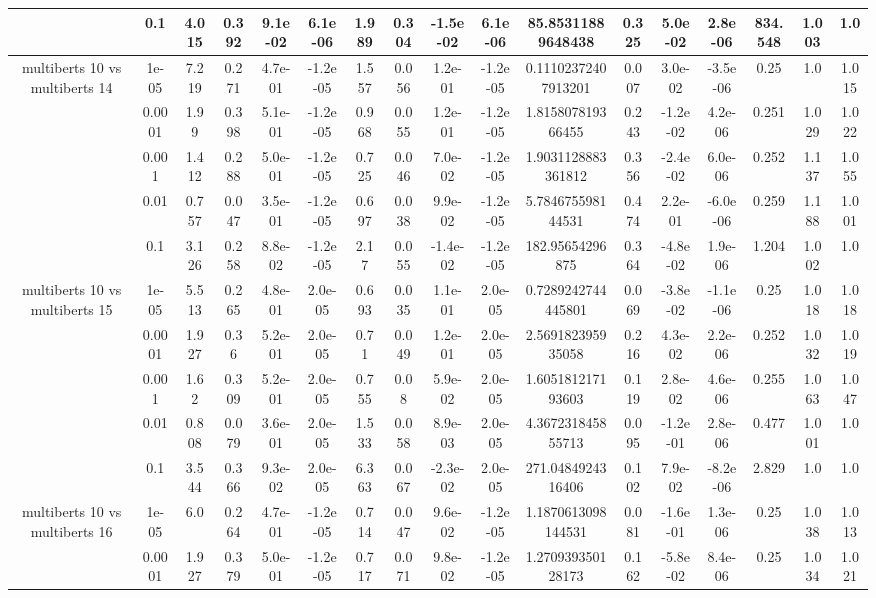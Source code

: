 \begin{tabular}{|c|c|c|c|c|c|c|c|c|c|c|c|c|c|c|c|c|}
 & 0.1 & 4.015 & 0.392 & 9.1e-02 & 6.1e-06 & 1.989 & 0.304 & -1.5e-02 & 6.1e-06 & 85.85311889648438 & 0.325 & 5.0e-02 & 2.8e-06 & 834.548 & 1.003 & 1.0 \\
\hline
\multirow{5}{*}{multiberts 10 vs multiberts 14} & 1e-05 & 7.219 & 0.271 & 4.7e-01 & -1.2e-05 & 1.557 & 0.056 & 1.2e-01 & -1.2e-05 & 0.11102372407913201 & 0.007 & 3.0e-02 & -3.5e-06 & 0.25 & 1.0 & 1.015 \\
 & 0.0001 & 1.99 & 0.398 & 5.1e-01 & -1.2e-05 & 0.968 & 0.055 & 1.2e-01 & -1.2e-05 & 1.815807819366455 & 0.243 & -1.2e-02 & 4.2e-06 & 0.251 & 1.029 & 1.022 \\
 & 0.001 & 1.412 & 0.288 & 5.0e-01 & -1.2e-05 & 0.725 & 0.046 & 7.0e-02 & -1.2e-05 & 1.9031128883361812 & 0.356 & -2.4e-02 & 6.0e-06 & 0.252 & 1.137 & 1.055 \\
 & 0.01 & 0.757 & 0.047 & 3.5e-01 & -1.2e-05 & 0.697 & 0.038 & 9.9e-02 & -1.2e-05 & 5.784675598144531 & 0.474 & 2.2e-01 & -6.0e-06 & 0.259 & 1.188 & 1.001 \\
 & 0.1 & 3.126 & 0.258 & 8.8e-02 & -1.2e-05 & 2.17 & 0.055 & -1.4e-02 & -1.2e-05 & 182.95654296875 & 0.364 & -4.8e-02 & 1.9e-06 & 1.204 & 1.002 & 1.0 \\
\hline
\multirow{5}{*}{multiberts 10 vs multiberts 15} & 1e-05 & 5.513 & 0.265 & 4.8e-01 & 2.0e-05 & 0.693 & 0.035 & 1.1e-01 & 2.0e-05 & 0.7289242744445801 & 0.069 & -3.8e-02 & -1.1e-06 & 0.25 & 1.018 & 1.018 \\
 & 0.0001 & 1.927 & 0.36 & 5.2e-01 & 2.0e-05 & 0.71 & 0.049 & 1.2e-01 & 2.0e-05 & 2.569182395935058 & 0.216 & 4.3e-02 & 2.2e-06 & 0.252 & 1.032 & 1.019 \\
 & 0.001 & 1.62 & 0.309 & 5.2e-01 & 2.0e-05 & 0.755 & 0.08 & 5.9e-02 & 2.0e-05 & 1.605181217193603 & 0.119 & 2.8e-02 & 4.6e-06 & 0.255 & 1.063 & 1.047 \\
 & 0.01 & 0.808 & 0.079 & 3.6e-01 & 2.0e-05 & 1.533 & 0.058 & 8.9e-03 & 2.0e-05 & 4.367231845855713 & 0.095 & -1.2e-01 & 2.8e-06 & 0.477 & 1.001 & 1.0 \\
 & 0.1 & 3.544 & 0.366 & 9.3e-02 & 2.0e-05 & 6.363 & 0.067 & -2.3e-02 & 2.0e-05 & 271.0484924316406 & 0.102 & 7.9e-02 & -8.2e-06 & 2.829 & 1.0 & 1.0 \\
\hline
\multirow{5}{*}{multiberts 10 vs multiberts 16} & 1e-05 & 6.0 & 0.264 & 4.7e-01 & -1.2e-05 & 0.714 & 0.047 & 9.6e-02 & -1.2e-05 & 1.1870613098144531 & 0.081 & -1.6e-01 & 1.3e-06 & 0.25 & 1.038 & 1.013 \\
 & 0.0001 & 1.927 & 0.379 & 5.0e-01 & -1.2e-05 & 0.717 & 0.071 & 9.8e-02 & -1.2e-05 & 1.270939350128173 & 0.162 & -5.8e-02 & 8.4e-06 & 0.25 & 1.034 & 1.021 \\

\end{tabular}
